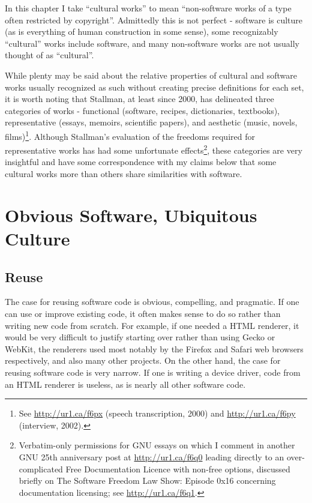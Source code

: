 In this chapter I take ``cultural works'' to mean ``non-software works of a type
often restricted by copyright''. Admittedly this is not perfect - software is
culture (as is everything of human construction in some sense), some
recognizably ``cultural'' works include software, and many non-software works
are not usually thought of as ``cultural''.

While plenty may be said about the relative properties of cultural and software
works usually recognized as such without creating precise def\hbox{}initions for
each set, it is worth noting that Stallman, at least since 2000, has delineated
three categories of works - functional (software, recipes, dictionaries,
textbooks), representative (essays, memoirs, scientif\hbox{}ic papers), and
aesthetic (music, novels, f\hbox{}ilms)\footnote{See \url{http://ur1.ca/f6px}
(speech transcription, 2000) and \url{http://ur1.ca/f6py} (interview, 2002).}.
Although Stallman’s evaluation of the freedoms required for representative works
has had some unfortunate ef\hbox{}fects\footnote{Verbatim-only permissions for
GNU essays on which I comment in another GNU 25th anniversary post at
\url{http://ur1.ca/f6q0} leading directly to an over-complicated Free
Documentation Licence with non-free options, discussed brief\hbox{}ly on The
Software Freedom Law Show: Episode 0x16 concerning documentation licensing; see
\url{http://ur1.ca/f6q1}.}, these categories are very insightful and have some
correspondence with my claims below that some cultural works more than others
share similarities with software.


\section{Obvious Software, Ubiquitous Culture}
\label{s:free_culture_software_freedom:obvious_software}


\subsection{Reuse}
\label{ss:free_culture_software_freedom:obvious_software:reuse}

The case for reusing software code is obvious, compelling, and pragmatic. If one
can use or improve existing code, it often makes sense to do so rather than
writing new code from scratch. For example, if one needed a HTML renderer, it
would be very dif\hbox{}f\hbox{}icult to justify starting over rather than using
Gecko or WebKit, the renderers used most notably by the F\hbox{}irefox and
Safari web browsers respectively, and also many other projects. On the other
hand, the case for reusing software code is very narrow. If one is writing a
device driver, code from an HTML renderer is useless, as is nearly all other
software code.


